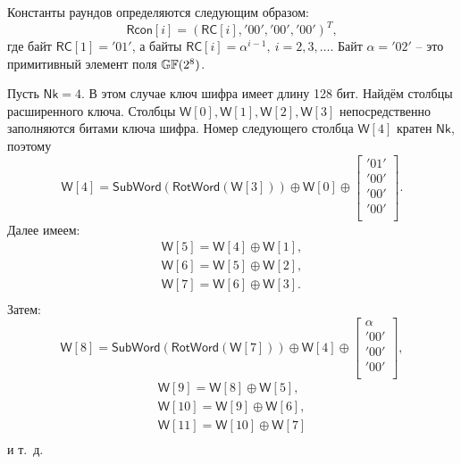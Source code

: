 Константы раундов определяются следующим образом:
    \[ \mathsf{Rcon}[i] = (\mathsf{RC}[i], \mathrm{'00'}, \mathrm{'00'}, \mathrm{'00'})^T, \]
где байт $\mathsf{RC}[1] = \mathrm{'01'}$, а байты $\mathsf{RC}[i] = \alpha^{i-1}, ~ i = 2, 3, \dots$. Байт $\alpha = \mathrm{'02'}$ -- это примитивный элемент поля $\mathbb{GF}(2^8)$.

\example
Пусть $\mathsf{Nk} = 4$. В этом случае ключ шифра имеет длину 128 бит. Найдём столбцы расширенного ключа. Столбцы $\mathsf{W}[0], \mathsf{W}[1], \mathsf{W}[2], \mathsf{W}[3]$ непосредственно заполняются битами ключа шифра. Номер следующего столбца $\mathsf{W}[4]$ кратен $\mathsf{Nk}$, поэтому
\[
    \mathsf{W}[4] = \mathsf{SubWord}(\mathsf{RotWord}(\mathsf{W}[3])) \oplus \mathsf{W}[0] \oplus
        \left[ \begin{array}{c}
            \mathrm{'01'} \\ \mathrm{'00'} \\ \mathrm{'00'} \\ \mathrm{'00'} \\
        \end{array} \right].
\]
Далее имеем:
\[
    \begin{array}{l}
        \mathsf{W}[5] = \mathsf{W}[4] \oplus \mathsf{W}[1], \\
        \mathsf{W}[6] = \mathsf{W}[5] \oplus \mathsf{W}[2], \\
        \mathsf{W}[7] = \mathsf{W}[6] \oplus \mathsf{W}[3].  \\
    \end{array}
\]
Затем:
\[
    \mathsf{W}[8] = \mathsf{SubWord}(\mathsf{RotWord}(\mathsf{W}[7])) \oplus \mathsf{W}[4] \oplus
        \left[ \begin{array}{c}
            \alpha \\
            \mathrm{'00'}\\
            \mathrm{'00'}\\
            \mathrm{'00'}\\
        \end{array} \right] ,
\] \[
    \begin{array}{l}
        \mathsf{W}[9] = \mathsf{W}[8] \oplus \mathsf{W}[5], \\
        \mathsf{W}[10] = \mathsf{W}[9] \oplus \mathsf{W}[6], \\
        \mathsf{W}[11] = \mathsf{W}[10] \oplus \mathsf{W}[7] \\
    \end{array}
\]
и т.~д.
\exampleend

